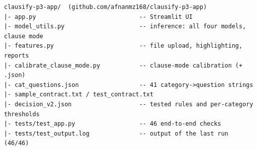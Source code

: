 {\begin{verbatim}
clausify-p3-app/  (github.com/afnanmz168/clausify-p3-app)
|- app.py                             -- Streamlit UI
|- model_utils.py                     -- inference: all four models, clause mode
|- features.py                        -- file upload, highlighting, reports
|- calibrate_clause_mode.py           -- clause-mode calibration (+ .json)
|- cat_questions.json                 -- 41 category->question strings
|- sample_contract.txt / test_contract.txt
|- decision_v2.json                   -- tested rules and per-category thresholds
|- tests/test_app.py                  -- 46 end-to-end checks
|- tests/test_output.log              -- output of the last run (46/46)
\end{verbatim}
}
